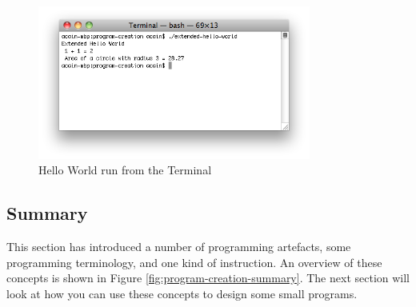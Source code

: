 \begin{figure}[h]
   \centering
   \includegraphics[width=0.8\textwidth]{./topics/program-creation/images/HelloWorld} 
   \caption[Hello World Terminal]{Hello World run from the Terminal}
   \label{fig:program-creation-helloworld}
\end{figure}






% 






\clearpage
\subsection{Summary} %
\label{sub:program_creation_concepts_summary}

This section has introduced a number of programming artefacts, some programming terminology, and one kind of instruction. An overview of these concepts is shown in Figure \ref{fig:program-creation-summary}. The next section will look at how you can use these concepts to design some small programs.

